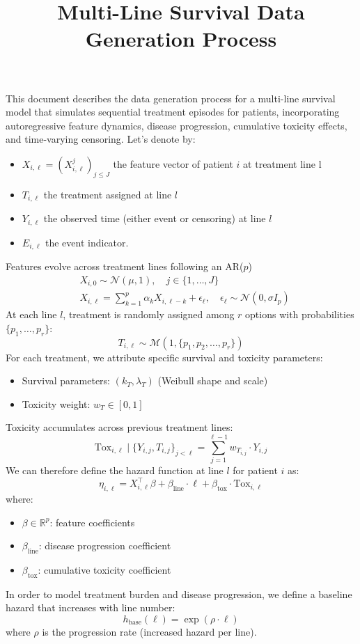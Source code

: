 \documentclass{article}
\title{Multi-Line Survival Data Generation Process}
\author{}
\date{}
\begin{document}
This document describes the data generation process for a multi-line survival model that simulates sequential treatment episodes for patients, incorporating autoregressive feature dynamics, disease progression, cumulative toxicity effects, and time-varying censoring.
Let's denote by:
\begin{itemize}
    \item $X_{i,\ell} = (X^{j}_{i,\ell})_{j \leq J}$ the feature vector of patient $i$ at treatment line l
    \item $T_{i,\ell}$ the treatment assigned at line $l$
    \item $Y_{i,\ell}$ the observed time (either event or censoring) at line $l$
    \item $E_{i,\ell}$ the event indicator.
\end{itemize}
Features evolve across treatment lines following an AR($p$)
\begin{align*}
    &X_{i,0} \sim \mathcal{N}(\mu, 1), \quad j \in \{1, \ldots, J\}\\
    &X_{i,\ell} = \sum_{k=1}^{p} \alpha_k X_{i,\ell-k} + \epsilon_\ell, \quad \epsilon_\ell \sim \mathcal{N}(0, \sigma I_p)
\end{align*}
At each line $l$, treatment is randomly assigned among $r$ options with probabilities $\{p_1, \ldots, p_{r}\}$:
\begin{equation*}
    T_{i,\ell} \sim \mathcal{M}(1, \{p_1, p_2, \ldots, p_r\})
\end{equation*}
For each treatment, we attribute specific survival and toxicity parameters:
\begin{itemize}
    \item Survival parameters: $(k_T, \lambda_T)$ (Weibull shape and scale)
    \item Toxicity weight: $w_T \in [0, 1]$
\end{itemize}
Toxicity accumulates across previous treatment lines:
\begin{equation*}
    \text{Tox}_{i,\ell} \mid \{Y_{i,j}, T_{i,j}\}_{j < \ell} = \sum_{j=1}^{\ell-1} w_{T_{i,j}} \cdot Y_{i,j}
\end{equation*}
We can therefore define the hazard function at line $l$ for patient $i$ as:
\begin{equation}
    \eta_{i,\ell} = X_{i,\ell}^\top \beta + \beta_{\text{line}} \cdot \ell + \beta_{\text{tox}} \cdot \text{Tox}_{i,\ell}
\end{equation}
where:
\begin{itemize}
    \item $\beta \in \mathbb{R}^p$: feature coefficients
    \item $\beta_{\text{line}}$: disease progression coefficient
    \item $\beta_{\text{tox}}$: cumulative toxicity coefficient
\end{itemize}
In order to model treatment burden and disease progression, we define a baseline hazard that increases with line number:
$$
    h_{\text{base}}(\ell) = \exp(\rho \cdot \ell)
$$
where $\rho$ is the progression rate (increased hazard per line).
\end{document}
